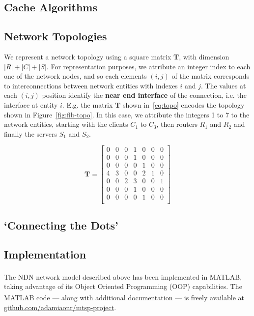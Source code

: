 \subsection{Cache Algorithms}
\label{subsec:meth-caching-algs}

\subsection{Network Topologies}
\label{subsec:meth-topologies}

We represent a network topology using a square matrix \textbf{T}, 
with dimension $|R|+|C|+|S|$. For representation purposes, we attribute an 
integer index to each one of the network nodes, and so each elements $(i,j)$ of the 
matrix corresponds to interconnections between network entities with indexes $i$ and $j$. The 
values at each $(i,j)$ position identify the \textbf{near end interface} of the 
connection, i.e. the interface at entity $i$. E.g. the matrix \textbf{T} shown 
in~\ref{eq:topo} encodes the topology shown in Figure~\ref{fig:fib-topo}. In this case, 
we attribute the integers 1 to 7 to the network entities, starting with the 
clients $C_1$ to $C_3$, then routers $R_1$ and $R_2$ and 
finally the servers $S_1$ and $S_2$.

\begin{equation}
\textbf{T} = \begin{bmatrix} 
                0 & 0 & 0 & 1 & 0 & 0 & 0               \\ 
                0 & 0 & 0 & 1 & 0 & 0 & 0               \\ 
                0 & 0 & 0 & 0 & 1 & 0 & 0               \\ 
                4 & 3 & 0 & 0 & 2 & 1 & 0               \\ 
                0 & 0 & 2 & 3 & 0 & 0 & 1               \\ 
                0 & 0 & 0 & 1 & 0 & 0 & 0               \\ 
                0 & 0 & 0 & 0 & 1 & 0 & 0               \\ \end{bmatrix}
    \label{eq:topo}
\end{equation}\shortvertbreak

\subsection{`Connecting the Dots'}
\label{subsec:meth-conn-dots}



\subsection{Implementation}
\label{subsec:meth-impl}

The NDN network model described above has been implemented in MATLAB\textsuperscript{\textregistered}, taking 
advantage of its Object Oriented Programming (OOP) capabilities. The MATLAB\textsuperscript{\textregistered} 
code --- along with additional documentation --- is freely available 
at \url{github.com/adamiaonr/mtsp-project}.
